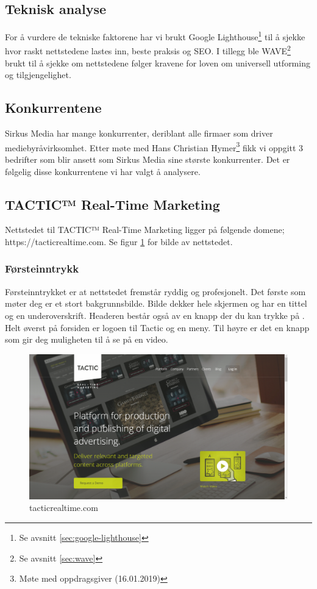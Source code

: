 \subsection{Teknisk analyse}
For å vurdere de tekniske faktorene har vi brukt Google Lighthouse\footnote{Se avsnitt \ref{sec:google-lighthouse}} til å sjekke hvor raskt nettstedene lastes inn, beste praksis og SEO. I tillegg ble WAVE\footnote{Se avsnitt \ref{sec:wave}} brukt til å sjekke om nettstedene følger kravene for loven om universell utforming og tilgjengelighet.

\subsection{Konkurrentene}
Sirkus Media har mange konkurrenter, deriblant alle firmaer som driver mediebyråvirksomhet. Etter møte med Hans Christian Hymer\footnote{Møte med oppdragsgiver (16.01.2019)} fikk vi oppgitt 3 bedrifter som blir ansett som Sirkus Media sine største konkurrenter. Det er følgelig disse konkurrentene vi har valgt å analysere.

\subsection{TACTIC™ Real-Time Marketing}
Nettstedet til TACTIC™ Real-Time Marketing ligger på følgende domene; https://tacticrealtime.com. Se figur \ref{fig:competitors-tacticrealtime.com} for bilde av nettstedet.

\subsubsection{Førsteinntrykk}
Førsteinntrykket er at nettstedet fremstår ryddig og profesjonelt. Det første som møter deg er et stort bakgrunnsbilde. Bilde dekker hele skjermen og har en tittel og en underoverskrift. Headeren består også av en knapp der du kan trykke på . Helt øverst på forsiden er logoen til Tactic og en meny. Til høyre er det en knapp som gir deg muligheten til å se på en video. 

\begin{figure}[H]
    \centering
    \includegraphics[width=\textwidth]{line/tacticrealtime_com_(1366x768).png}
    \caption{tacticrealtime.com}
    \label{fig:competitors-tacticrealtime.com}
\end{figure}

